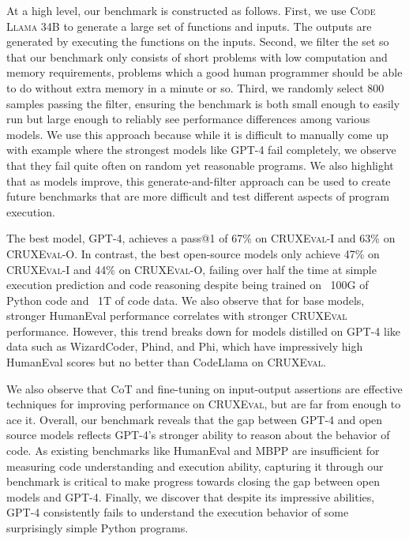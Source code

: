 \documentclass{article}
\newcommand{\benchmark}{\textsc{CRUXEval}\xspace}
\newcommand{\benchmarki}{\textsc{CRUXEval-I}\xspace}
\newcommand{\benchmarko}{\textsc{CRUXEval-O}\xspace}
\newcommand{\codellamalarge}{\textsc{Code Llama 34B}\xspace}
\begin{document}
At a high level, our benchmark is constructed as follows. First, we use \codellamalarge to generate a large set of functions and inputs. The outputs are generated by executing the functions on the inputs. Second, we filter the set so that our benchmark only consists of short problems with low computation and memory requirements, problems which a good human programmer should be able to do without extra memory in a minute or so. Third, we randomly select 800 samples passing the filter, ensuring the benchmark is both small enough to easily run but large enough to reliably see performance differences among various models. We use this approach because while it is difficult to manually come up with example where the strongest models like GPT-4 fail completely, we observe that they fail quite often on random yet reasonable programs. We also highlight that as models improve, this generate-and-filter approach can be used to create future benchmarks that are more difficult and test different aspects of program execution.

The best model, GPT-4, achieves a pass@1 of 67\% on \benchmarki and 63\% on \benchmarko. In contrast, the best open-source models only achieve 47\% on \benchmarki and 44\% on \benchmarko, failing over half the time at simple execution prediction and code reasoning despite being trained on ~100G of Python code and ~1T of code data. We also observe that for base models, stronger HumanEval performance correlates with stronger \benchmark performance. However, this trend breaks down for models distilled on GPT-4 like data such as WizardCoder, Phind, and Phi, which have impressively high HumanEval scores but no better than CodeLlama on \benchmark.

We also observe that CoT and fine-tuning on input-output assertions are effective techniques for improving performance on \benchmark, but are far from enough to ace it. Overall, our benchmark reveals that the gap between GPT-4 and open source models reflects GPT-4's stronger ability to reason about the behavior of code. As existing benchmarks like HumanEval and MBPP are insufficient for measuring code understanding and execution ability, capturing it through our benchmark is critical to make progress towards closing the gap between open models and GPT-4. Finally, we discover that despite its impressive abilities, GPT-4 consistently fails to understand the execution behavior of some surprisingly simple Python programs. 


%
\end{document}
